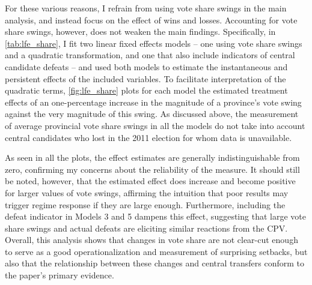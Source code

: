 \documentclass[12pt]{article}
\newcommand{\1}{\mathbbm{1}}
\begin{document}
For these various reasons, I refrain from using vote share swings in the main analysis, and instead focus on the effect of wins and losses. Accounting for vote share swings, however, does not weaken the main findings. Specifically, in \autoref{tab:lfe_share}, I fit two linear fixed effects models -- one using vote share swings and a quadratic transformation, and one that also include indicators of central candidate defeats -- and used both models to estimate the instantaneous and persistent effects of the included variables. To facilitate interpretation of the quadratic terms, \autoref{fig:lfe_share} plots for each model the estimated treatment effects of an one-percentage increase in the magnitude of a province's vote swing against the very magnitude of this swing. As discussed above, the measurement of average provincial vote share swings in all the models do not take into account central candidates who lost in the 2011 election for whom data is unavailable.



As seen in all the plots, the effect estimates are generally indistinguishable from zero, confirming my concerns about the reliability of the measure. It should still be noted, however, that the estimated effect does increase and become positive for larger values of vote swings, affirming the intuition that poor results may trigger regime response if they are large enough. Furthermore, including the defeat indicator in Models 3 and 5 dampens this effect, suggesting that large vote share swings and actual defeats are eliciting similar reactions from the CPV. Overall, this analysis shows that changes in vote share are not clear-cut enough to serve as a good operationalization and measurement of surprising setbacks, but also that the relationship between these changes and central transfers conform to the paper's primary evidence. 
\end{document}
